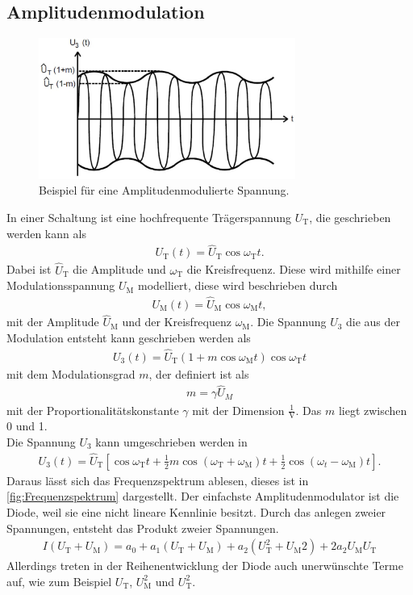 \subsection{Amplitudenmodulation}
\begin{figure}[h!]
	\centering
	\includegraphics[width = 0.75\textwidth]{../Grafiken/Frequenzbaender.pdf}
	\caption{Beispiel für eine Amplitudenmodulierte Spannung.\cite{V59}}
\end{figure}
In einer Schaltung ist eine hochfrequente Trägerspannung $U_\text{T}$, die geschrieben werden kann als
\begin{align}
	U_\text{T}(t)=\hat U_\text{T}\cos\omega_\text{T}t.
\end{align}
Dabei ist $\hat U_\text{T}$ die Amplitude und $\omega_\text{T}$ die Kreisfrequenz.
Diese wird mithilfe einer Modulationsspannung $U_\text{M}$ modelliert, diese wird beschrieben durch
\begin{align}
	U_\text{M}(t)=\hat U_\text{M}\cos\omega_\text{M}t,
\end{align}
mit der Amplitude $\hat U_\text{M}$ und der Kreisfrequenz $\omega_\text{M}$.
Die Spannung $U_3$ die aus der Modulation entsteht kann geschrieben werden als
\begin{align}
	U_3(t)=\hat U_\text{T}\left(1+m\cos\omega_\text{M}t\right)\cos \omega_\text{T}t
\end{align}
mit dem Modulationsgrad $m$, der definiert ist als 
\begin{align}
	m = \gamma \hat U_M
\end{align}
mit der Proportionalitätskonstante $\gamma$ mit der Dimension $\frac{1}{\text{V}}$.
Das $m$ liegt zwischen 0 und 1.\\
Die Spannung $U_3$ kann umgeschrieben werden in
\begin{align}
	U_3(t)=\hat U_\text{T} \left[\cos\omega_\text{T}t+\frac{1}{2}m\cos\left(\omega_\text{T}+\omega_\text{M}\right)t+\frac{1}{2}\cos\left(\omega_t-\omega_\text{M}\right)t\right].
\end{align}
Daraus lässt sich das Frequenzspektrum ablesen, dieses ist in \cref{fig:Frequenzspektrum} dargestellt.
Der einfachste Amplitudenmodulator ist die Diode, weil sie eine nicht lineare Kennlinie besitzt.
Durch das anlegen zweier Spannungen, entsteht das Produkt zweier Spannungen. 
\begin{align}
	I(U_\text{T}+U_\text{M})=a_0+a_1(U_\text{T}+U_\text{M})+a_2\left(U_\text{T}^2+U_\text{M} 2\right)+2a_2U_\text{M}U_\text{T}
\end{align}
Allerdings treten in der Reihenentwicklung der Diode auch unerwünschte Terme auf, wie zum Beispiel $U_\text{T}$, $U_\text{M}^2$ und $U_\text{T}^2$.

